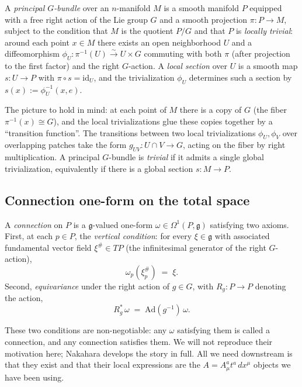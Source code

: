 A \emph{principal $G$-bundle} over an $n$-manifold $M$ is a smooth manifold $P$ equipped with a free right action of the Lie group $G$ and a smooth projection $\pi : P \to M$, subject to the condition that $M$ is the quotient $P/G$ and that $P$ is \emph{locally trivial}: around each point $x \in M$ there exists an open neighborhood $U$ and a diffeomorphism $\phi_U : \pi^{-1}(U) \xrightarrow{\sim} U \times G$ commuting with both $\pi$ (after projection to the first factor) and the right $G$-action. A \emph{local section} over $U$ is a smooth map $s : U \to P$ with $\pi \circ s = \mathrm{id}_U$, and the trivialization $\phi_U$ determines such a section by $s(x) := \phi_U^{-1}(x, e)$.

The picture to hold in mind: at each point of $M$ there is a copy of $G$ (the fiber $\pi^{-1}(x) \cong G$), and the local trivializations glue these copies together by a ``transition function''. The transitions between two local trivializations $\phi_U, \phi_V$ over overlapping patches take the form $g_{UV} : U \cap V \to G$, acting on the fiber by right multiplication. A principal $G$-bundle is \emph{trivial} if it admits a single global trivialization, equivalently if there is a global section $s : M \to P$.

\subsection{Connection one-form on the total space}\label{sec:connection-on-total-space}

A \emph{connection} on $P$ is a $\mathfrak{g}$-valued one-form $\omega \in \Omega^1(P, \mathfrak{g})$ satisfying two axioms. First, at each $p \in P$, the \emph{vertical condition}: for every $\xi \in \mathfrak{g}$ with associated fundamental vector field $\xi^\# \in TP$ (the infinitesimal generator of the right $G$-action),
\begin{equation}\label{eq:vertical-axiom}
\omega_p(\xi^\#_p) \;=\; \xi.
\end{equation}
Second, \emph{equivariance} under the right action of $g \in G$, with $R_g : P \to P$ denoting the action,
\begin{equation}\label{eq:equivariance-axiom}
R_g^* \,\omega \;=\; \mathrm{Ad}(g^{-1})\, \omega.
\end{equation}

These two conditions are non-negotiable: any $\omega$ satisfying them is called a connection, and any connection satisfies them. We will not reproduce their motivation here; Nakahara \cite{Nakahara2003GTP} develops the story in full. All we need downstream is that they exist and that their local expressions are the $A = A_\mu^a t^a\, dx^\mu$ objects we have been using.

